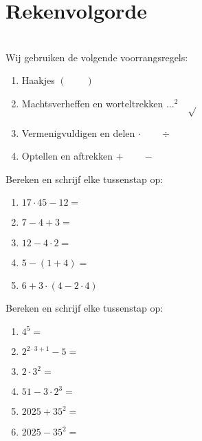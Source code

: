 \documentclass{tstextbook}
\begin{document}
\section{Rekenvolgorde}
\begin{theorem}
    \label{th:rekenvolgorde}\phantom{e}
    \\
    Wij gebruiken de volgende voorrangsregels:
    \begin{enumerate}
     \item Haakjes \hfill $( \qquad )$ \hfill 
     \item Machtsverheffen en worteltrekken \hfill $\ldots^2 \quad \sqrt{}$ \hfill 
     \item Vermenigvuldigen en delen \hfill $\cdot \qquad \div$
     \item Optellen en aftrekken \hfill $+ \qquad  -$
    \end{enumerate}
\end{theorem}
\begin{exercise}
    Bereken en schrijf elke tussenstap op:
        \begin{enumerate}
            \item $17 \cdot 45 - 12 = $
            \item $7 - 4 + 3 = $
            \item $12 - 4 \cdot 2 = $
            \item $5 - (1 + 4) = $
            \item $6 + 3 \cdot (4 - 2 \cdot 4)$
        \end{enumerate}
\end{exercise}

\begin{exercise}
    Bereken en schrijf elke tussenstap op:
        \begin{enumerate}
            \item $4^5 = $
            \item $2^{2 \cdot 3 + 1} - 5 = $
            \item $2 \cdot 3^2 = $
            \item $51 - 3 \cdot 2^3 = $
            \item $2025 + 35^2 = $
            \item $2025 - 35^2 = $
        \end{enumerate}
\end{exercise}
\end{document}
